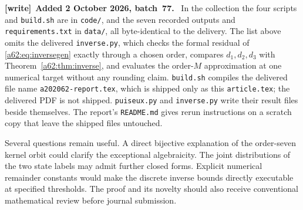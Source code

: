 \documentclass[11pt,letterpaper]{article}
\theoremstyle{remark}\newtheorem{remark}[theorem]{Remark}
\newenvironment{writenote}[1][]{\par\smallskip\begingroup\small
 \noindent\textbf{[write]}\if\relax\detokenize{#1}\relax\else~\textbf{#1.}\fi\ }%
 {\par\endgroup\smallskip}
\begin{document}
\begin{writenote}[Added 2 October 2026, batch~77]
In the collection the four scripts and \texttt{build.sh} are in
\texttt{code/}, and the seven recorded outputs and
\texttt{requirements.txt} in \texttt{data/}, all byte-identical to the
delivery. The list above omits the delivered \texttt{inverse.py}, which
checks the formal residual of \eqref{a62:eq:inversegen} exactly through a
chosen order, compares $d_1,d_2,d_3$ with Theorem~\ref{a62:thm:inverse},
and evaluates the order-$M$ approximation at one numerical target without
any rounding claim. \texttt{build.sh} compiles the delivered file name
\texttt{a202062-report.tex}, which is shipped only as this
\texttt{article.tex}; the delivered PDF is not shipped. \texttt{puiseux.py}
and \texttt{inverse.py} write their result files beside themselves. The
report's \texttt{README.md} gives rerun instructions on a scratch copy
that leave the shipped files untouched.
\end{writenote}

Several questions remain useful. A direct bijective explanation of the order-seven kernel orbit could clarify the exceptional algebraicity. The joint distributions of the two state labels may admit further closed forms. Explicit numerical remainder constants would make the discrete inverse bounds directly executable at specified thresholds. The proof and its novelty should also receive conventional mathematical review before journal submission.
\end{document}
